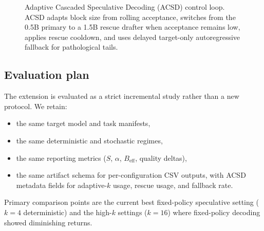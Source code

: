 \begin{figure}[t]
{%
}
\caption{Adaptive Cascaded Speculative Decoding (ACSD) control loop. ACSD
adapts block size from rolling acceptance, switches from the 0.5B primary to a
1.5B rescue drafter when acceptance remains low, applies rescue cooldown, and
uses delayed target-only autoregressive fallback for pathological tails.}
\label{fig:acsd-flow}
\end{figure}

\subsection{Evaluation plan}

The extension is evaluated as a strict incremental study rather than a new
protocol. We retain:
\begin{itemize}
  \item the same target model and task manifests,
  \item the same deterministic and stochastic regimes,
  \item the same reporting metrics ($S$, $\alpha$, $B_{\text{eff}}$, quality deltas),
  \item the same artifact schema for per-configuration CSV outputs, with ACSD
        metadata fields for adaptive-$k$ usage, rescue usage, and fallback rate.
\end{itemize}

Primary comparison points are the current best fixed-policy speculative
setting ($k{=}4$ deterministic) and the high-$k$ settings ($k{=}16$) where
fixed-policy decoding showed diminishing returns.

